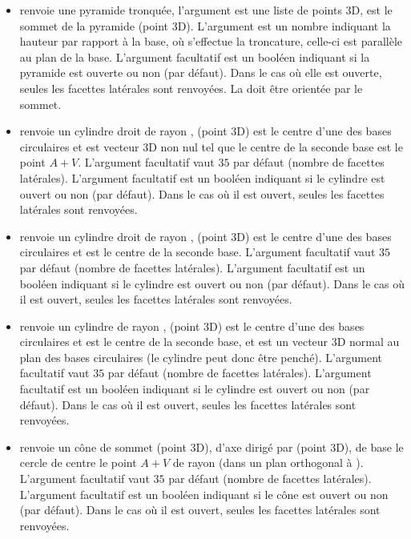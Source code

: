 \begin{itemize}
    \item {} renvoie une pyramide tronquée, l'argument  est une liste de points 3D,  est le sommet de la pyramide (point 3D). L'argument  est un nombre indiquant la hauteur par rapport à la base, où s'effectue la troncature, celle-ci est parallèle au plan de la base. L'argument facultatif  est un booléen indiquant si la pyramide est ouverte ou non (\false par défaut). Dans le cas où elle est ouverte, seules les facettes latérales sont renvoyées. La  doit être orientée par le sommet.
    
    \item {} renvoie un cylindre droit de rayon ,  (point 3D) est le centre d'une des bases circulaires et  est vecteur 3D non nul tel que le centre de la seconde base est le point $A+V$. L'argument facultatif  vaut $35$ par défaut (nombre de facettes latérales). L'argument facultatif  est un booléen indiquant si le cylindre est ouvert ou non (\false par défaut). Dans le cas où il est ouvert, seules les facettes latérales sont renvoyées.
    
    \item {} renvoie un cylindre droit de rayon ,  (point 3D) est le centre d'une des bases circulaires et  est le centre de la seconde base. L'argument facultatif  vaut $35$ par défaut (nombre de facettes latérales). L'argument facultatif  est un booléen indiquant si le cylindre est ouvert ou non (\false par défaut). Dans le cas où il est ouvert, seules les facettes latérales sont renvoyées.
    
   \item {} renvoie un cylindre de rayon ,  (point 3D) est le centre d'une des bases circulaires et  est le centre de la seconde base, et  est un vecteur 3D normal au plan des bases circulaires (le cylindre peut donc être penché). L'argument facultatif  vaut $35$ par défaut (nombre de facettes latérales). L'argument facultatif  est un booléen indiquant si le cylindre est ouvert ou non (\false par défaut). Dans le cas où il est ouvert, seules les facettes latérales sont renvoyées.
    
    \item {} renvoie un cône de sommet  (point 3D), d'axe dirigé par  (point 3D), de base le cercle de centre le point $A+V$ de rayon  (dans un plan orthogonal à ). L'argument facultatif  vaut $35$ par défaut (nombre de facettes latérales). L'argument facultatif  est un booléen indiquant si le cône est ouvert ou non (\false par défaut). Dans le cas où il est ouvert, seules les facettes latérales sont renvoyées.


\end{itemize}
